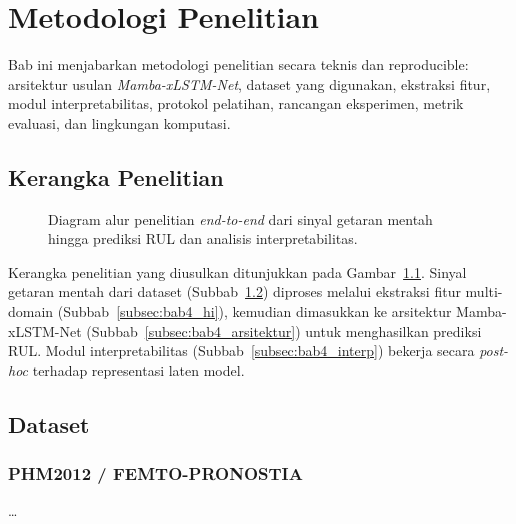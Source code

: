 
\chapter{Metodologi Penelitian}
\label{bab:metodologi}

Bab ini menjabarkan metodologi penelitian secara teknis dan
reproducible: arsitektur usulan \emph{Mamba-xLSTM-Net}, dataset yang
digunakan, ekstraksi fitur, modul interpretabilitas, protokol
pelatihan, rancangan eksperimen, metrik evaluasi, dan lingkungan
komputasi.

\section{Kerangka Penelitian}
\label{subsec:bab4_kerangka}

\begin{figure}[ht]
\centering
\caption{Diagram alur penelitian \emph{end-to-end} dari sinyal getaran
mentah hingga prediksi RUL dan analisis interpretabilitas.}
\label{fig:bab4_kerangka}
\end{figure}

Kerangka penelitian yang diusulkan ditunjukkan pada
Gambar~\ref{fig:bab4_kerangka}. Sinyal getaran mentah dari dataset
(Subbab~\ref{subsec:bab4_dataset}) diproses melalui ekstraksi fitur
multi-domain (Subbab~\ref{subsec:bab4_hi}), kemudian dimasukkan ke
arsitektur Mamba-xLSTM-Net (Subbab~\ref{subsec:bab4_arsitektur}) untuk
menghasilkan prediksi RUL. Modul interpretabilitas
(Subbab~\ref{subsec:bab4_interp}) bekerja secara \emph{post-hoc}
terhadap representasi laten model.

\section{Dataset}
\label{subsec:bab4_dataset}

\subsection{PHM2012 / FEMTO-PRONOSTIA}
\label{subsec:bab4_phm2012}
\dots

